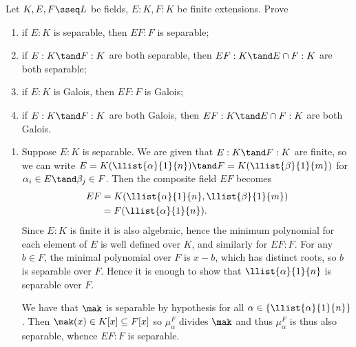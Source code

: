 \documentclass{article}
\begin{document}
\setcounter{section}{10} %
\begin{exercise}
  Let \( K,E,F\sseq L \) be fields, \( E:K,F:K \) be finite extensions. Prove \begin{enumerate}[label=(\alph*)]
    \item if \( E:K \) is separable, then \( EF:F \) is separable;
    \item if \( E:K\tand F:K \) are both separable, then \( EF:K \tand E\cap F:K \) are both separable;
    \item if \( E:K \) is Galois, then \( EF:F \) is Galois;
    \item if \( E:K\tand F:K \) are both Galois, then \( EF:K\tand E\cap F:K \) are both Galois.
  \end{enumerate}
\end{exercise}
\begin{enumerate}[label=(\alph*)]
  \item \label{qs:one-a} \begin{solution}
    Suppose \( E:K \) is separable.
    We are given that \( E:K\tand F:K \) are finite, so we can write \( E = K(\llist{\alpha}{1}{n}) \tand F = K(\llist{\beta}{1}{m}) \) for \( \alpha_i\in E \tand \beta_j\in F \).
    Then the composite field \( EF \) becomes \begin{align*}
      EF &= K(\llist{\alpha}{1}{n},\llist{\beta}{1}{m}) \\
      &= F(\llist{\alpha}{1}{n}).
    \end{align*}
    Since \( E:K \) is finite it is also algebraic, hence the minimum polynomial for each element of \( E \) is well defined over \( K \), and similarly for \( EF:F \).
    For any \( b\in F \), the minimal polynomial over \( F \) is \( x - b \), which has distinct roots, so \( b \) is separable over \( F \).
    Hence it is enough to show that \( \llist{\alpha}{1}{n} \) is separable over \( F \).

    We have that \( \mak \) is separable by hypothesis for all \( \alpha\in \left\{ \llist{\alpha}{1}{n} \right\} \).
    Then \( \mak(x)\in K[x]\subseteq F[x] \) so \( \mu_\alpha^F \) divides \( \mak \) and thus \( \mu_\alpha^F \) is thus also separable, whence \( EF:F \) is separable.
  \end{solution}


\end{enumerate}
\end{document}
